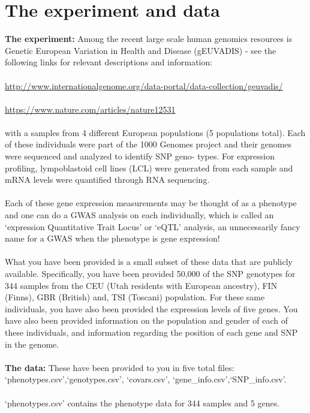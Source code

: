 \documentclass[letterpaper, 11pt]{article}
\begin{document}
\section{The experiment and data}

\textbf{The experiment:}  Among the recent large scale human genomics resources is Genetic European Variation in Health and Disease (gEUVADIS) - see the following links for relevant descriptions and information:\\
\\
\url{http://www.internationalgenome.org/data-portal/data-collection/geuvadis/}\\
\\
\url{https://www.nature.com/articles/nature12531}\\
\\
with a samples from 4 different European populations (5 populations total). Each of these individuals were part of the 1000 Genomes project and their genomes were sequenced and analyzed to identify SNP geno- types. For expression profiling, lympoblastoid cell lines (LCL) were generated from each sample and mRNA levels were quantified through RNA sequencing.\\
\\
Each of these gene expression measurements may be thought of as a phenotype and one can do a GWAS analysis on each individually, which is called an `expression Quantitative Trait Locus' or `eQTL' analysis, an unnecessarily fancy name for a GWAS when the phenotype is gene expression!\\
\\
What you have been provided is a small subset of these data that are publicly available. Specifically, you have been provided 50,000 of the SNP genotypes for 344 samples from the CEU (Utah residents with European ancestry), FIN (Finns), GBR (British) and, TSI (Toscani) population. For these same individuals, you have also been provided the expression levels of five genes. You have also been provided information on the population and gender of each of these individuals, and information regarding the position of each gene and SNP in the genome. 
\\
\\
\textbf{The data:}  These have been provided to you in five total files: `phenotypes.csv',`genotypes.csv', `covars.csv', `gene\_info.csv',`SNP\_info.csv'.\\
\\
`phenotypes.csv' contains the phenotype data for 344 samples and 5 genes.\\
\end{document}
